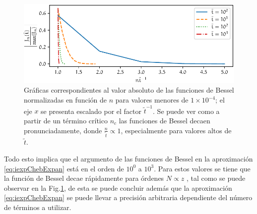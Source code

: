 \begin{figure}[htb]
	\centering
	\includegraphics{./img/normJ_n(t).pdf}
	\caption[Funciones de Bessel Normalizadas]{Gráficas correspondientes al valor absoluto de las funciones de Bessel normalizadas en función de $n$ para valores menores de $1\times10^{-4}$; el eje $x$ se presenta escalado por el factor $\tilde{t}^{-1}$. Se puede ver como a partir de un término crítico $n_c$ las funciones de Bessel decaen pronunciadamente, donde $\frac n{\tilde t} \propto 1$, especialmente para valores altos de $\tilde{t}$.}
	\label{fig:normJ_n(t)}
\end{figure}

Todo esto implica que el argumento de las funciones de Bessel en la aproximación \eqref{eq:iexpChebExpan} está en el 
orden de $10^0$ a $10^3$. Para estos valores se tiene que la función de Bessel decae rápidamente para órdenes $N \propto 
z$ \autocite{Fan2018}, tal como se puede observar en la Fig.\ref{fig:normJ_n(t)}, de esta se puede concluir además que la
aproximación \eqref{eq:iexpChebExpan} se puede llevar a precisión arbitraria dependiente del número de términos a
utilizar.


